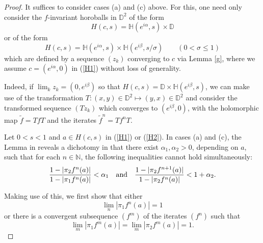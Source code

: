 \documentclass[12pt, twoside]{article}
\theoremstyle{definition}
\numberwithin{equation}{section}
\begin{document}
\begin{proof}
It suffices to consider cases (a) and (c) above. For this, one need only consider
 the $f$-invariant horoballs in $\mathbb{D}^2$
 of the form
\begin{equation}\label{H1}
H(c,s)  =\mathbb{H}(e^{i\alpha},s)\times \mathbb{D}
\end{equation}
or of the form
\begin{equation}\label{H2}
H(c,s) = \mathbb{H}(e^{i\alpha},s) \times \mathbb{H}(e^{i\beta},s/\sigma) \qquad (0<\sigma\leq 1)
\end{equation}
which are defined by a sequence $(z_k)$  converging to $c$ via Lemma \ref{g}, where we assume
$c=(e^{i\alpha},0)$ in (\ref{H1}) without loss of generality.

Indeed, if $\lim_k z_k = (0, e^{i\beta})$
so that $H(c,s) = \mathbb{D} \times \mathbb{H}(e^{i\beta},s)$,
 we can make use of the transformation
$T: (x,y) \in \mathbb{D}^2 \mapsto (y,x)\in \mathbb{D}^2$ and consider the transformed sequence $(Tz_k)$
which converges to $(e^{i\beta},0)$, with the holomorphic map $\widetilde f = TfT$ and the iterates $\widetilde f^n = Tf^nT$.

Let $0<s<1$ and $a\in H(c,s)$ in (\ref{H1}) or (\ref{H2}).
In cases (a) and (c), the Lemma in \cite[p.\,11]{h1} reveals a dichotomy in that there exist $\alpha_1,\alpha_2>0$, depending on $a$,
such that for each $n\in \mathbb{N}$,
the following inequalities cannot hold simultaneously:
\begin{equation}\label{dicot}
\frac{1-|\pi_2f^n(a)|}{1-|\pi_1 f^n(a)|}<\alpha_1 \quad {\rm and} \quad \frac{1-|\pi_2 f^{n+1}(a)|}{1-|\pi_2 f^n(a)|}< 1+ \alpha_2.
\end{equation}

Making use of this, we first  show  that either
\begin{equation}\label{extreme0}
\lim_n| \pi_1 f^n(a)| =1
\end{equation}
 or there is a convergent subsequence $(f^m)$ of the iterates $(f^n)$ such that
\begin{equation}\label{extreme}
\lim_m |\pi_1 f^m(a)|= \lim_m |\pi_2 f^m(a)|=1.
\end{equation}


\end{proof}
\end{document}
